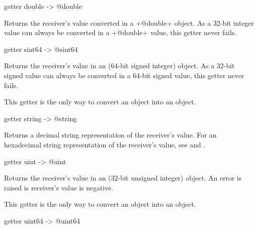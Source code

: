
\begin{galgas}
getter double -> @double
\end{galgas}

Returns the receiver's value converted in a \ggs+@double+ object. As a 32-bit integer value can always be converted in a \ggs+@double+ value, this getter never fails.






\begin{galgas}
getter sint64 -> @sint64
\end{galgas}

Returns the receiver's value in an  (64-bit signed integer) object. As a 32-bit signed value can always be converted in a 64-bit signed value, this getter never fails.

This getter is the only way to convert an  object into an  object.






\begin{galgas}
getter string -> @string
\end{galgas}

Returns a decimal string representation of the receiver's value. For an hexadecimal string representation of the receiver's value, see  and .








\begin{galgas}
getter uint -> @uint
\end{galgas}

Returns the receiver's value in an  (32-bit unsigned integer) object. An error is raised is receiver's value is negative.

This getter is the only way to convert an  object into an  object.





\begin{galgas}
getter uint64 -> @uint64
\end{galgas}

